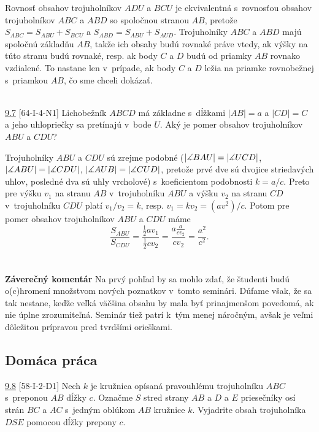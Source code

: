 \rie Rovnosť obsahov trojuholníkov $ADU$ a $BCU$ je ekvivalentná s~rovnosťou obsahov trojuholníkov $ABC$ a $ABD$ so spoločnou stranou $AB$, pretože $S_{ABC}=S_{ABU}+S_{BCU}$ a $S_{ABD}=S_{ABU}+S_{AUD}$. Trojuholníky $ABC$ a $ABD$ majú spoločnú základňu $AB$, takže ich obsahy budú rovnaké práve vtedy, ak výšky na túto stranu budú rovnaké, resp. ak body $C$ a $D$ budú od priamky $AB$ rovnako vzdialené. To nastane len v~prípade, ak body $C$ a $D$ ležia na priamke rovnobežnej s~priamkou $AB$, čo sme chceli dokázať.\\
\\
\begin{tcolorbox}[breakable,notitle,boxrule=0pt,colback=light-gray,colframe=light-gray]\ul{9.7} [64-I-4-N1] Lichobežník $ABCD$ má základne s~dĺžkami $|AB|=a$ a $|CD|=C$ a jeho uhlopriečky sa pretínajú v~bode $U$. Aký je pomer obsahov trojuholníkov $ABU$ a $CDU$?

\end{tcolorbox}

\rie Trojuholníky $ABU$ a $CDU$ sú zrejme podobné ($|\measuredangle BAU|=|\measuredangle UCD|$, $|\measuredangle ABU|=|\measuredangle CDU|$, $|\measuredangle AUB|=|\measuredangle CUD|$, pretože prvé dve sú dvojice striedavých uhlov, posledné dva sú uhly vrcholové) s~koeficientom podobnosti $k=a/c$. Preto pre výšku $v_1$ na stranu $AB$ v~trojuholníku $ABU$ a výšku $v_2$ na stranu $CD$ v~trojuholníku $CDU$ platí $v_1/v_2=k$, resp. $v_1=kv_2=(av^2)/c$. Potom pre pomer obsahov trojuholníkov $ABU$ a $CDU$ máme
$$\frac{S_{ABU}}{S_{CDU}}=\frac{\frac{1}{2}av_1}{\frac{1}{2}cv_2}=\frac{a\frac{a}{cv_2}}{cv_2}=\frac{a^2}{c^2}.$$\\
\\
\textbf{Záverečný komentár} Na prvý pohľad by sa mohlo zdať, že študenti budú o(c)hromení množstvom nových poznatkov v~tomto seminári. Dúfame však, že sa tak nestane, keďže veľká väčšina obsahu by mala byť prinajmenšom povedomá, ak nie úplne zrozumiteľná. Seminár tiež patrí k~tým menej náročným, avšak je veľmi dôležitou prípravou pred tvrdšími orieškami.

\subsection*{Domáca práca}
\begin{tcolorbox}[breakable,notitle,boxrule=0pt,colback=light-gray,colframe=light-gray]\ul{9.8} [58-I-2-D1] Nech $k$ je kružnica opísaná pravouhlému trojuholníku $ABC$ s~preponou $AB$ dĺžky $c$. Označme $S$ stred strany $AB$ a $D$ a $E$ priesečníky osí strán $BC$ a $AC$ s~jedným oblúkom $AB$ kružnice $k$. Vyjadrite obsah trojuholníka $DSE$ pomocou dĺžky prepony $c$.

\end{tcolorbox}

